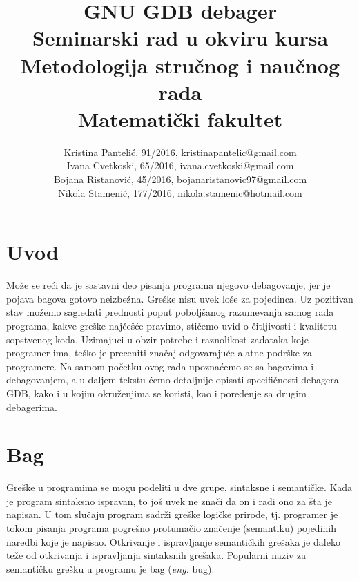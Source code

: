 \documentclass[a4paper]{article}
\begin{document}
\title{GNU GDB debager\\ \small{Seminarski rad u okviru kursa\\Metodologija stručnog i naučnog rada\\ Matematički fakultet}}

\author{Kristina Pantelić, 91/2016, kristinapantelic@gmail.com 
\\
Ivana Cvetkoski, 65/2016, ivana.cvetkoski@gmail.com
\\
Bojana Ristanović, 45/2016, bojanaristanovic97@gmail.com
\\
Nikola Stamenić, 177/2016, nikola.stamenic@hotmail.com
}

\maketitle


\tableofcontents

\newpage

\section{Uvod}
\label{sec:uvod}

Može se reći da je sastavni deo pisanja programa njegovo
debagovanje, jer je pojava bagova gotovo neizbežna. Greške nisu uvek
loše za pojedinca. Uz pozitivan stav možemo sagledati prednosti
poput poboljšanog razumevanja samog rada programa,
kakve greške najčešće pravimo, stičemo uvid o čitljivosti i
kvalitetu sopstvenog koda. Uzimajuci u obzir potrebe i raznolikost
zadataka koje programer ima, teško je preceniti značaj odgovarajuće
alatne podrške za programere. \cite{seminarski_rad}
Na samom početku ovog rada
upoznaćemo se sa bagovima i debagovanjem, a u daljem tekstu ćemo
detaljnije opisati specifičnosti debagera GDB, kako i u kojim
okruženjima se koristi, kao i poređenje sa drugim debagerima. 

\section{Bag}
\label{sec:bag}
Greške u programima se mogu podeliti u dve grupe, sintaksne i semantičke. Kada je program sintaksno ispravan, to još uvek
 ne znači da on i radi ono za šta je napisan. U tom slučaju program sadrži greške logičke prirode, tj. programer je tokom 
 pisanja programa  pogrešno protumačio značenje (semantiku) pojedinih naredbi koje je napisao. Otkrivanje i ispravljanje 
 semantičkih grešaka je daleko teže od otkrivanja i ispravljanja sintaksnih grešaka. Popularni naziv za semantičku grešku 
 u programu je bag (\textit{eng.} bug).
\end{document}
